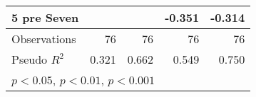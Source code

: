 \begin{table}[htbp]
\begin{tabular}{l*{4}{D{.}{.}{-1}}}
5 pre Seven         &                     &                     &      -0.351\sym{**} &      -0.314\sym{***}\\
\midrule
Observations        &          76         &          76         &          76         &          76         \\
Pseudo \(R^{2}\)    &       0.321         &       0.662         &       0.549         &       0.750         \\
\bottomrule
{}\\
\end{tabular}
\end{table}
